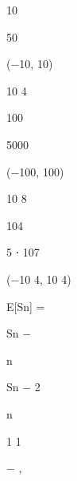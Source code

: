 \documentclass[a4paper,portrait,12pt]{article}
\begin{document}
10





50





($-$10, 10)





10 4





100





5000





($-$100, 100)





10 8





104





5 ⋅ 107





($-$10 4, 10 4)





\begin{flushleft}
E[Sn] =
\end{flushleft}





\begin{flushleft}
Sn $-$
\end{flushleft}





\begin{flushleft}
n
\end{flushleft}





\begin{flushleft}
Sn $-$ 2
\end{flushleft}


\begin{flushleft}
n
\end{flushleft}


1 1


$-$ ,
\end{document}
